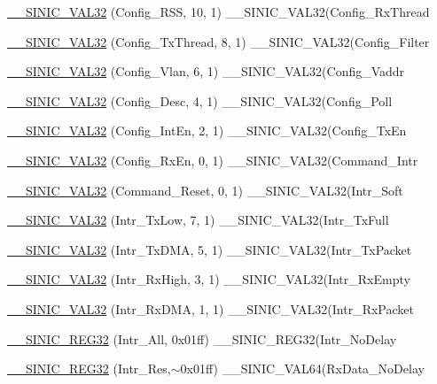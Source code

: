 \begin{DoxyCompactItemize}
\item 
\hyperlink{namespaceSinic_1_1Regs_a76178a015709c6e9dd675896de3e34c9}{\_\-\_\-SINIC\_\-VAL32} (Config\_\-RSS, 10, 1) \_\-\_\-SINIC\_\-VAL32(Config\_\-RxThread
\item 
\hyperlink{namespaceSinic_1_1Regs_a93862c2608fa0c0f83c8fa0972936784}{\_\-\_\-SINIC\_\-VAL32} (Config\_\-TxThread, 8, 1) \_\-\_\-SINIC\_\-VAL32(Config\_\-Filter
\item 
\hyperlink{namespaceSinic_1_1Regs_aa007f0659c38ef204cfffe32396ea15e}{\_\-\_\-SINIC\_\-VAL32} (Config\_\-Vlan, 6, 1) \_\-\_\-SINIC\_\-VAL32(Config\_\-Vaddr
\item 
\hyperlink{namespaceSinic_1_1Regs_ae0fbc614549507f08a2a4b846eb72bf2}{\_\-\_\-SINIC\_\-VAL32} (Config\_\-Desc, 4, 1) \_\-\_\-SINIC\_\-VAL32(Config\_\-Poll
\item 
\hyperlink{namespaceSinic_1_1Regs_afe2cd4380ee1a5e6f351a5396245bcf0}{\_\-\_\-SINIC\_\-VAL32} (Config\_\-IntEn, 2, 1) \_\-\_\-SINIC\_\-VAL32(Config\_\-TxEn
\item 
\hyperlink{namespaceSinic_1_1Regs_aa64e553e52828eeabd7a0f7a34df493a}{\_\-\_\-SINIC\_\-VAL32} (Config\_\-RxEn, 0, 1) \_\-\_\-SINIC\_\-VAL32(Command\_\-Intr
\item 
\hyperlink{namespaceSinic_1_1Regs_a092b9fc5be50a4046607e619a74bebd3}{\_\-\_\-SINIC\_\-VAL32} (Command\_\-Reset, 0, 1) \_\-\_\-SINIC\_\-VAL32(Intr\_\-Soft
\item 
\hyperlink{namespaceSinic_1_1Regs_ab74c21c9aae513bd929456c949a072b7}{\_\-\_\-SINIC\_\-VAL32} (Intr\_\-TxLow, 7, 1) \_\-\_\-SINIC\_\-VAL32(Intr\_\-TxFull
\item 
\hyperlink{namespaceSinic_1_1Regs_a592ae159611d8add61271ab85a94f4bb}{\_\-\_\-SINIC\_\-VAL32} (Intr\_\-TxDMA, 5, 1) \_\-\_\-SINIC\_\-VAL32(Intr\_\-TxPacket
\item 
\hyperlink{namespaceSinic_1_1Regs_a9eaf21ebdcaa54b7677e848153e9a98d}{\_\-\_\-SINIC\_\-VAL32} (Intr\_\-RxHigh, 3, 1) \_\-\_\-SINIC\_\-VAL32(Intr\_\-RxEmpty
\item 
\hyperlink{namespaceSinic_1_1Regs_a15c8e7a88ff5037b52606fad41516ae2}{\_\-\_\-SINIC\_\-VAL32} (Intr\_\-RxDMA, 1, 1) \_\-\_\-SINIC\_\-VAL32(Intr\_\-RxPacket
\item 
\hyperlink{namespaceSinic_1_1Regs_af59b1adc2e9d7e568f47395397b62a28}{\_\-\_\-SINIC\_\-REG32} (Intr\_\-All, 0x01ff) \_\-\_\-SINIC\_\-REG32(Intr\_\-NoDelay
\item 
\hyperlink{namespaceSinic_1_1Regs_aa9827c004ca9c2b42740c79987e60278}{\_\-\_\-SINIC\_\-REG32} (Intr\_\-Res,$\sim$0x01ff) \_\-\_\-SINIC\_\-VAL64(RxData\_\-NoDelay

\end{DoxyCompactItemize}
